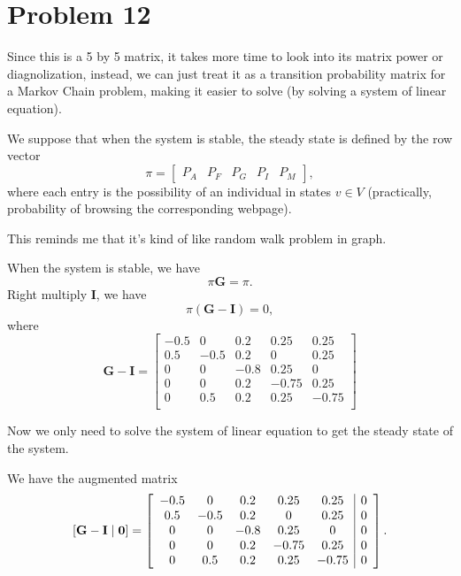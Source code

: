 \documentclass[12pt,a4paper]{article}
\begin{document}
\section*{Problem 12}
\begin{solution}
    Since this is a 5 by 5 matrix, it takes more time to look into its matrix power or diagnolization, instead, we can just treat it as a transition probability matrix for a Markov Chain problem, making it easier to solve (by solving a system of linear equation).

    We suppose that when the system is stable, the steady state is defined by the row vector
    \[
    \pi = \begin{bmatrix}P_A & P_F & P_G & P_I & P_M\end{bmatrix},
    \]
    where each entry is the possibility of an individual in states $v\in V$ (practically, probability of browsing the corresponding webpage).
    \begin{remark}
        This reminds me that it's kind of like random walk problem in graph.
    \end{remark}

    When the system is stable, we have 
    \[
    \pi \mathbf{G} = \pi.
    \]
    Right multiply $\mathbf{I}$, we have
    \[
    \pi (\mathbf{G} - \mathbf{I}) = 0,
    \]
    where
    \[
    \mathbf{G} - \mathbf{I} =
    \begin{bmatrix}
    -0.5 & 0 & 0.2 & 0.25 & 0.25 \\
    0.5 & -0.5 & 0.2 & 0 & 0.25 \\
    0 & 0 & -0.8 & 0.25 & 0 \\
    0 & 0 & 0.2 & -0.75 & 0.25 \\
    0 & 0.5 & 0.2 & 0.25 & -0.75 \\
    \end{bmatrix}
    \]

    Now we only need to solve the system of linear equation to get the steady state of the system.

    We have the augmented matrix 
    $$[\mathbf{G} - \mathbf{I} \mid \mathbf{0}]
    =
    \left[\begin{array}{ccccc|c}
    -0.5 & 0 & 0.2 & 0.25 & 0.25 & 0 \\
    0.5 & -0.5 & 0.2 & 0 & 0.25 & 0 \\
    0 & 0 & -0.8 & 0.25 & 0 & 0 \\
    0 & 0 & 0.2 & -0.75 & 0.25 & 0 \\
    0 & 0.5 & 0.2 & 0.25 & -0.75 & 0
    \end{array}\right].
    $$


\end{solution}
\end{document}
